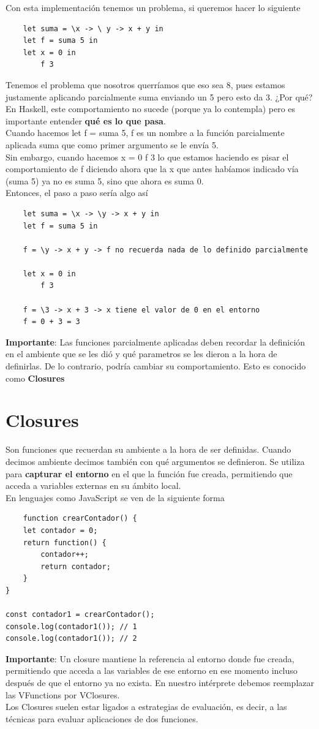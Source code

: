 \documentclass[10pt,a4paper]{article}
\begin{document}
Con esta implementación tenemos un problema, si queremos hacer lo siguiente 
\begin{lstlisting}
    let suma = \x -> \ y -> x + y in
    let f = suma 5 in 
    let x = 0 in 
        f 3 
\end{lstlisting}
Tenemos el problema que nosotros querríamos que eso sea 8, pues estamos justamente aplicando parcialmente suma enviando un 5 pero esto da 3. ¿Por qué? \\
En Haskell, este comportamiento no sucede (porque ya lo contempla) pero es importante entender \textbf{qué es lo que pasa}. \\
Cuando hacemos let f = suma 5, f es un nombre a la función parcialmente aplicada suma que como primer argumento se le envía 5. \\
Sin embargo, cuando hacemos x = 0 f 3 lo que estamos haciendo es pisar el comportamiento de f diciendo ahora que la x que antes habíamos indicado vía (suma 5) ya no es suma 5, sino que ahora es suma 0. \\
Entonces, el paso a paso sería algo así 
\begin{lstlisting}
    let suma = \x -> \y -> x + y in 
    let f = suma 5 in 
    
    f = \y -> x + y -> f no recuerda nada de lo definido parcialmente

    let x = 0 in 
        f 3 
    
    f = \3 -> x + 3 -> x tiene el valor de 0 en el entorno 
    f = 0 + 3 = 3 
\end{lstlisting}
\textbf{Importante}: Las funciones parcialmente aplicadas deben recordar la definición en el ambiente que se les dió y qué parametros se les dieron a la hora de definirlas. De lo contrario, podría cambiar su comportamiento. Esto es conocido como \textbf{Closures}
\section*{Closures}
Son funciones que recuerdan su ambiente a la hora de ser definidas. Cuando decimos ambiente decimos también con qué argumentos se definieron. Se utiliza para \textbf{capturar el entorno} en el que la función fue creada, permitiendo que acceda a variables externas en su ámbito local. \\
En lenguajes como JavaScript se ven de la siguiente forma 
\begin{lstlisting}
    function crearContador() {
    let contador = 0;
    return function() {
        contador++;
        return contador;
    }
}

const contador1 = crearContador();
console.log(contador1()); // 1
console.log(contador1()); // 2
\end{lstlisting}
\textbf{Importante}: Un closure mantiene la referencia al entorno donde fue creada, permitiendo que acceda a las variables de ese entorno en ese momento incluso después de que el entorno ya no exista.
En nuestro intérprete debemos reemplazar las VFunctions por VClosures. \\
Los Closures suelen estar ligados a estrategias de evaluación, es decir, a las técnicas para evaluar aplicaciones de dos funciones. 
\end{document}

